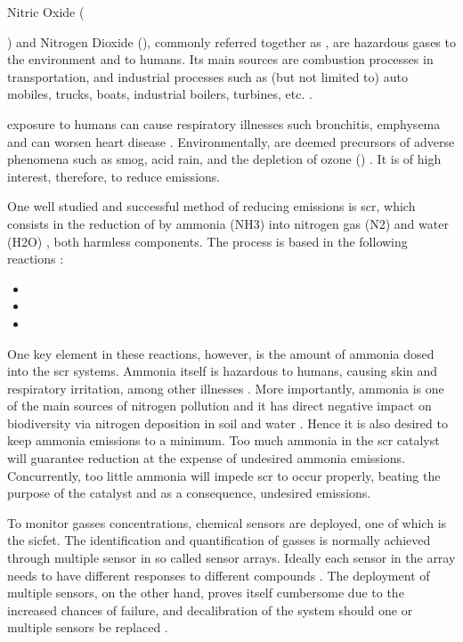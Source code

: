 Nitric Oxide ({) and Nitrogen Dioxide (), commonly referred together as \nox,  are hazardous gases to the environment and to humans. Its main sources are combustion processes in transportation, and industrial processes such as (but not limited to) auto mobiles, trucks, boats, industrial boilers, turbines, etc. \cite{EPA_2019}.

\nox exposure to humans can cause respiratory illnesses such bronchitis, emphysema and can worsen heart disease \cite{Boningari_2016}. Environmentally, \nox are deemed precursors of adverse phenomena such as smog, acid rain, and the depletion of ozone () \cite{Bernabeo_2019}. It is of high interest, therefore, to reduce \nox emissions.

One well studied and successful method of reducing emissions is \acrfull{scr}, which consists in the reduction of \nox by ammonia (NH3) into nitrogen gas (N2) and water (H2O) \cite{Forzatti_2001}, both harmless components. The process is based in the following reactions \cite{Forzatti_2001}:
\begin{itemize}
	\item {}
	
	\item {}
	
	\item {}
\end{itemize}


One key element in these reactions, however, is the amount of ammonia dosed into the \acrshort{scr} systems. Ammonia itself is hazardous to humans, causing skin and respiratory irritation, among other illnesses \cite{ASTDRA_2004}. More importantly, ammonia is one of the main sources of nitrogen pollution and it has direct negative impact on biodiversity via nitrogen deposition in soil and water \cite{RAND_2018}. Hence it is also desired to keep ammonia emissions to a minimum. Too much ammonia in the \acrshort{scr} catalyst will guarantee \nox reduction at the expense of undesired ammonia emissions. Concurrently, too little ammonia will impede \acrshort{scr} to occur properly, beating the purpose of the catalyst and as a consequence, undesired \nox emissions.

To monitor gasses concentrations, chemical sensors are deployed, one of which is the \acrfull{sicfet}. The identification and quantification of gasses is normally achieved through multiple sensor in so called sensor arrays. Ideally each sensor in the array needs to have different responses to different compounds \cite{Bastuck_2019}. The deployment of multiple sensors, on the other hand, proves itself cumbersome due to the increased chances of failure, and decalibration of the system should one or multiple sensors be replaced \cite{Bastuck_2019}.

}
